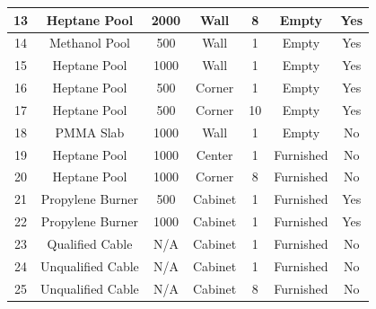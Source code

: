 \begin{table}[h!]
\begin{center}
\begin{tabular}{|c|c|c|c|c|c|c|}
13      & Heptane Pool      &    2000       & Wall          & 8                 & Empty                 &        Yes \\ \hline
14      & Methanol Pool     &     500       & Wall          & 1                 & Empty                 &        Yes \\ \hline
15      & Heptane Pool      &    1000       & Wall          & 1                 & Empty                 &        Yes \\ \hline
16      & Heptane Pool      &     500       & Corner        & 1                 & Empty                 &        Yes \\ \hline
17      & Heptane Pool      &     500       & Corner        & 10                & Empty                 &        Yes \\ \hline
18      &  PMMA Slab        &    1000       & Wall          & 1                 & Empty                 &         No \\ \hline
19      & Heptane Pool      &    1000       & Center        & 1                 & Furnished             &         No \\ \hline
20      & Heptane Pool      &    1000       & Corner        & 8                 & Furnished             &         No \\ \hline
21      & Propylene Burner  &     500       & Cabinet       & 1                 & Furnished             &        Yes \\ \hline
22      & Propylene Burner  &    1000       & Cabinet       & 1                 & Furnished             &        Yes \\ \hline
23      & Qualified Cable   &        N/A    & Cabinet       & 1                 & Furnished             &         No \\ \hline
24      & Unqualified Cable &        N/A    & Cabinet       & 1                 & Furnished             &         No \\ \hline
25      & Unqualified Cable &        N/A    & Cabinet       & 8                 & Furnished             &         No \\ \hline
\end{tabular}
\end{center}
\label{FM_SNL_Matrix}
\end{table}



